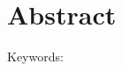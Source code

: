 
\chapter*{Abstract}
\label{cha:Abstract}

\thispagestyle{empty}


\blindtext[2]

\vspace{\fill}

\begin{description}
	\item[Keywords:] \keywords
\end{description}